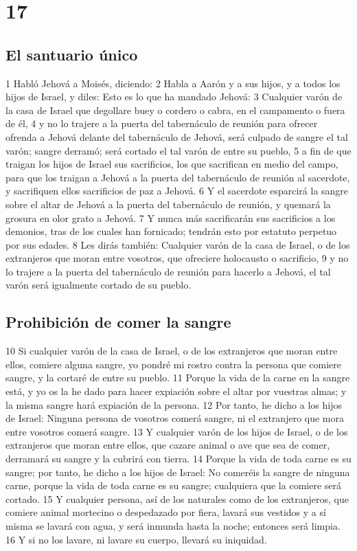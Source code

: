 \chapter{17}

\section*{El santuario único}

1 Habló Jehová a Moisés, diciendo:
2 Habla a Aarón y a sus hijos, y a todos los hijos de Israel, y diles: Esto es lo que ha mandado Jehová:
3 Cualquier varón de la casa de Israel que degollare buey o cordero o cabra, en el campamento o fuera de él,
4 y no lo trajere a la puerta del tabernáculo de reunión para ofrecer ofrenda a Jehová delante del tabernáculo de Jehová, será culpado de sangre el tal varón; sangre derramó; será cortado el tal varón de entre su pueblo,
5 a fin de que traigan los hijos de Israel sus sacrificios, los que sacrifican en medio del campo, para que los traigan a Jehová a la puerta del tabernáculo de reunión al sacerdote, y sacrifiquen ellos sacrificios de paz a Jehová.
6 Y el sacerdote esparcirá la sangre sobre el altar de Jehová a la puerta del tabernáculo de reunión, y quemará la grosura en olor grato a Jehová.
7 Y nunca más sacrificarán sus sacrificios a los demonios, tras de los cuales han fornicado; tendrán esto por estatuto perpetuo por sus edades.
8 Les dirás también: Cualquier varón de la casa de Israel, o de los extranjeros que moran entre vosotros, que ofreciere holocausto o sacrificio,
9 y no lo trajere a la puerta del tabernáculo de reunión para hacerlo a Jehová, el tal varón será igualmente cortado de su pueblo. 

\section*{Prohibición de comer la sangre}

10 Si cualquier varón de la casa de Israel, o de los extranjeros que moran entre ellos, comiere alguna sangre, yo pondré mi rostro contra la persona que comiere sangre, y la cortaré de entre su pueblo.
11 Porque la vida de la carne en la sangre está, y yo os la he dado para hacer expiación sobre el altar por vuestras almas; y la misma sangre hará expiación de la persona.
12 Por tanto, he dicho a los hijos de Israel: Ninguna persona de vosotros comerá sangre, ni el extranjero que mora entre vosotros comerá sangre.
13 Y cualquier varón de los hijos de Israel, o de los extranjeros que moran entre ellos, que cazare animal o ave que sea de comer, derramará su sangre y la cubrirá con tierra.
14 Porque la vida de toda carne es su sangre; por tanto, he dicho a los hijos de Israel: No comeréis la sangre de ninguna carne, porque la vida de toda carne es su sangre; cualquiera que la comiere será cortado.
15 Y cualquier persona, así de los naturales como de los extranjeros, que comiere animal mortecino o despedazado por fiera, lavará sus vestidos y a sí misma se lavará con agua, y será inmunda hasta la noche; entonces será limpia.
16 Y si no los lavare, ni lavare su cuerpo, llevará su iniquidad.

